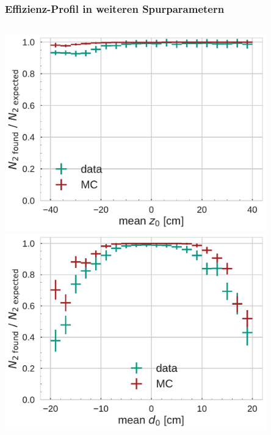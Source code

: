 \documentclass[18pt]{beamer}
\begin{document}
\begin{frame}
  \frametitle{Effizienz-Profil in weiteren Spurparametern}
  \begin{columns}
    \begin{column}{0.5\textwidth}
      \centering
      \includegraphics[width=0.85\textwidth]{figures/efficiency_study/cosmicbased_findeff_over_z0.pdf}\\
      \includegraphics[width=0.85\textwidth]{figures/efficiency_study/cosmicbased_findeff_over_d0.pdf}
      

\end{column}
\end{columns}
\end{frame}
\end{document}
